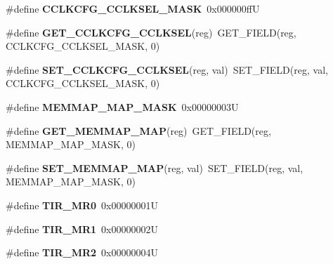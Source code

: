 \begin{DoxyCompactItemize}
\#define {\bfseries C\+C\+L\+K\+C\+F\+G\+\_\+\+C\+C\+L\+K\+S\+E\+L\+\_\+\+M\+A\+SK}~0x000000ffU
\item 
\mbox{\label{group__lpc24xx__regs_ga97ea8913fbdc1d740d48291695ad6ce2}} 
\#define {\bfseries G\+E\+T\+\_\+\+C\+C\+L\+K\+C\+F\+G\+\_\+\+C\+C\+L\+K\+S\+EL}(reg)~G\+E\+T\+\_\+\+F\+I\+E\+LD(reg, C\+C\+L\+K\+C\+F\+G\+\_\+\+C\+C\+L\+K\+S\+E\+L\+\_\+\+M\+A\+SK, 0)
\item 
\mbox{\label{group__lpc24xx__regs_gaaf9dd57646b46314db079cc62cbd90f2}} 
\#define {\bfseries S\+E\+T\+\_\+\+C\+C\+L\+K\+C\+F\+G\+\_\+\+C\+C\+L\+K\+S\+EL}(reg,  val)~S\+E\+T\+\_\+\+F\+I\+E\+LD(reg, val, C\+C\+L\+K\+C\+F\+G\+\_\+\+C\+C\+L\+K\+S\+E\+L\+\_\+\+M\+A\+SK, 0)
\item 
\mbox{\label{group__lpc24xx__regs_ga7d69853c033cfde2b5d8763a50000e30}} 
\#define {\bfseries M\+E\+M\+M\+A\+P\+\_\+\+M\+A\+P\+\_\+\+M\+A\+SK}~0x00000003U
\item 
\mbox{\label{group__lpc24xx__regs_ga42b1fe82be0a2c8654d5879144a59597}} 
\#define {\bfseries G\+E\+T\+\_\+\+M\+E\+M\+M\+A\+P\+\_\+\+M\+AP}(reg)~G\+E\+T\+\_\+\+F\+I\+E\+LD(reg, M\+E\+M\+M\+A\+P\+\_\+\+M\+A\+P\+\_\+\+M\+A\+SK, 0)
\item 
\mbox{\label{group__lpc24xx__regs_gad12404068c77f51e7df7c231ef4c7559}} 
\#define {\bfseries S\+E\+T\+\_\+\+M\+E\+M\+M\+A\+P\+\_\+\+M\+AP}(reg,  val)~S\+E\+T\+\_\+\+F\+I\+E\+LD(reg, val, M\+E\+M\+M\+A\+P\+\_\+\+M\+A\+P\+\_\+\+M\+A\+SK, 0)
\item 
\mbox{\label{group__lpc24xx__regs_ga1293215725dba91885968b990ef24f20}} 
\#define {\bfseries T\+I\+R\+\_\+\+M\+R0}~0x00000001U
\item 
\mbox{\label{group__lpc24xx__regs_ga011cd1f74c696d270e5f195f3be088a9}} 
\#define {\bfseries T\+I\+R\+\_\+\+M\+R1}~0x00000002U
\item 
\mbox{\label{group__lpc24xx__regs_gadc4328d928a679911a292a8734d7742a}} 
\#define {\bfseries T\+I\+R\+\_\+\+M\+R2}~0x00000004U
\item 
\mbox{\label{group__lpc24xx__regs_gaa7e255dc828e7fe58f745f01cabf6327}} 

\end{DoxyCompactItemize}
